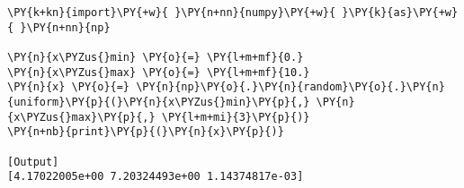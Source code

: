 \begin{Verbatim}[label=\makebox{\href{https://github.com/unipi-physics-labs/statnotes/tree/main/snippy/np.random.uniform.py}{https://github.com/.../np.random.uniform.py}},commandchars=\\\{\}]
\PY{k+kn}{import}\PY{+w}{ }\PY{n+nn}{numpy}\PY{+w}{ }\PY{k}{as}\PY{+w}{ }\PY{n+nn}{np}

\PY{n}{x\PYZus{}min} \PY{o}{=} \PY{l+m+mf}{0.}
\PY{n}{x\PYZus{}max} \PY{o}{=} \PY{l+m+mf}{10.}
\PY{n}{x} \PY{o}{=} \PY{n}{np}\PY{o}{.}\PY{n}{random}\PY{o}{.}\PY{n}{uniform}\PY{p}{(}\PY{n}{x\PYZus{}min}\PY{p}{,} \PY{n}{x\PYZus{}max}\PY{p}{,} \PY{l+m+mi}{3}\PY{p}{)}
\PY{n+nb}{print}\PY{p}{(}\PY{n}{x}\PY{p}{)}

[Output]
[4.17022005e+00 7.20324493e+00 1.14374817e-03]
\end{Verbatim}
